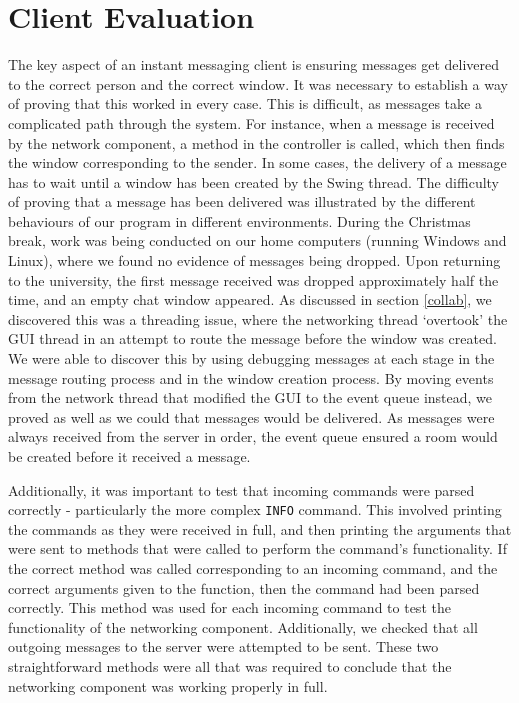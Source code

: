 \section{Client Evaluation}
\label{client_eval}

The key aspect of an instant messaging client is ensuring messages get delivered to the correct person and the correct window. It was necessary to establish a way of proving that this worked in every case. This is difficult, as messages take a complicated path through the system. For instance, when a message is received by the network component, a method in the controller is called, which then finds the window corresponding to the sender. In some cases, the delivery of a message has to wait until a window has been created by the Swing thread. The difficulty of proving that a message has been delivered was illustrated by the different behaviours of our program in different environments. During the Christmas break, work was being conducted on our home computers (running Windows and Linux), where we found no evidence of messages being dropped. Upon returning to the university, the first message received was dropped approximately half the time, and an empty chat window appeared. As discussed in section \ref{collab}, we discovered this was a threading issue, where the networking thread `overtook' the GUI thread in an attempt to route the message before the window was created. We were able to discover this by using debugging messages at each stage in the message routing process and in the window creation process. By moving events from the network thread that modified the GUI to the event queue instead, we proved as well as we could that messages would be delivered. As messages were always received from the server in order, the event queue ensured a room would be created before it received a message. 

Additionally, it was important to test that incoming commands were parsed correctly - particularly the more complex \texttt{INFO} command. This involved printing the commands as they were received in full, and then printing the arguments that were sent to methods that were called to perform the command's functionality. If the correct method was called corresponding to an incoming command, and the correct arguments given to the function, then the command had been parsed correctly. This method was used for each incoming command to test the functionality of the networking component. Additionally, we checked that all outgoing messages to the server were attempted to be sent. These two straightforward methods were all that was required to conclude that the networking component was working properly in full.

